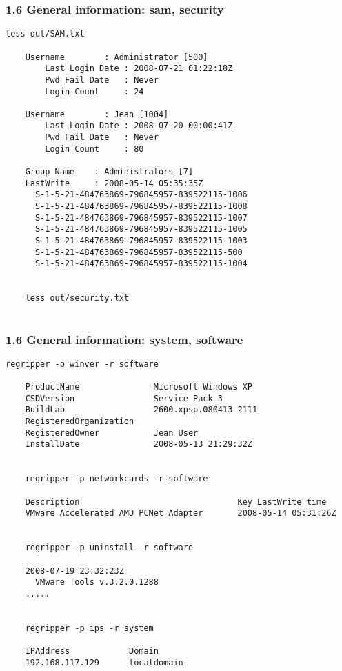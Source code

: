 \begin{frame}[fragile]
  \frametitle{1.6 General information: sam, security}
  \begin{lstlisting}[basicstyle=\tiny]
    less out/SAM.txt

	Username        : Administrator [500]
		Last Login Date : 2008-07-21 01:22:18Z
		Pwd Fail Date   : Never
		Login Count     : 24

	Username        : Jean [1004]
		Last Login Date : 2008-07-20 00:00:41Z
		Pwd Fail Date   : Never
		Login Count     : 80

	Group Name    : Administrators [7]
	LastWrite     : 2008-05-14 05:35:35Z
	  S-1-5-21-484763869-796845957-839522115-1006
	  S-1-5-21-484763869-796845957-839522115-1008
	  S-1-5-21-484763869-796845957-839522115-1007
	  S-1-5-21-484763869-796845957-839522115-1005
	  S-1-5-21-484763869-796845957-839522115-1003
	  S-1-5-21-484763869-796845957-839522115-500
	  S-1-5-21-484763869-796845957-839522115-1004


    less out/security.txt
	
  \end{lstlisting}
\end{frame}


\begin{frame}[fragile]
  \frametitle{1.6 General information: system, software}
  \begin{lstlisting}[basicstyle=\tiny]
    regripper -p winver -r software 

	ProductName               Microsoft Windows XP
	CSDVersion                Service Pack 3      
	BuildLab                  2600.xpsp.080413-2111
	RegisteredOrganization                        
	RegisteredOwner           Jean User           
	InstallDate               2008-05-13 21:29:32Z


    regripper -p networkcards -r software 

	Description                                Key LastWrite time                                
	VMware Accelerated AMD PCNet Adapter       2008-05-14 05:31:26Z


    regripper -p uninstall -r software

	2008-07-19 23:32:23Z
	  VMware Tools v.3.2.0.1288
	.....


    regripper -p ips -r system

	IPAddress            Domain
	192.168.117.129      localdomain   
  \end{lstlisting}
\end{frame}


